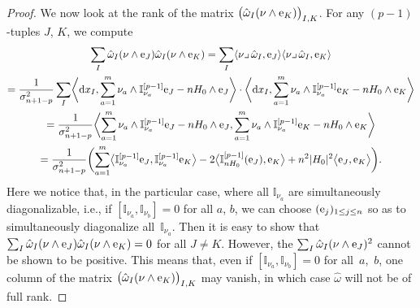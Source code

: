 \documentclass[pdftex]{sigma}
\numberwithin{equation}{section}
\begin{document}
\begin{proof}
We now look at the rank of the matrix $\bigl(\hat{\omega}_I(\nu\wedge {\rm e}_K)\bigr)_{I,K}$. For any $(p-1)$-tuples $J$, $K$, we compute
\begin{gather*}
\sum_I\hat{\omega}_I(\nu\wedge {\rm e}_J)\hat{\omega}_I(\nu\wedge {\rm e}_K)=\sum_I\langle\nu\lrcorner\,\hat{\omega}_I,{\rm e}_J\rangle\langle\nu\lrcorner\,\hat{\omega}_I,{\rm e}_K\rangle\\
 =\frac{1}{\sigma_{n+1-p}^2}\sum_I \biggl\langle {\rm d}x_I,\sum_{a=1}^m \nu_a\wedge\mathbb{I}_{\nu_a}^{[p-1]}{\rm e}_J-nH_0\wedge {\rm e}_J\biggr\rangle\cdot \biggl\langle {\rm d}x_I,\sum_{a=1}^m \nu_a\wedge\mathbb{I}_{\nu_a}^{[p-1]}{\rm e}_K-nH_0\wedge {\rm e}_K\biggr\rangle\\
 =\frac{1}{\sigma_{n+1-p}^2}\biggl\langle\sum_{a=1}^m \nu_a\wedge\mathbb{I}_{\nu_a}^{[p-1]}{\rm e}_J-nH_0\wedge {\rm e}_J,
\sum_{a=1}^m \nu_a\wedge\mathbb{I}_{\nu_a}^{[p-1]}{\rm e}_K-nH_0\wedge {\rm e}_K\biggr\rangle\\
 =\frac{1}{\sigma_{n+1-p}^2}\biggl(\sum_{a=1}^m\bigl\langle \mathbb{I}_{\nu_a}^{[p-1]}{\rm e}_J,\mathbb{I}_{\nu_a}^{[p-1]}{\rm e}_K\bigr\rangle
-2\bigl\langle\mathbb{I}_{nH_0}^{[p-1]}({\rm e}_J),{\rm e}_K\bigr\rangle+n^2|H_0|^2\bigl\langle {\rm e}_J,{\rm e}_K\bigr\rangle\biggr).
\end{gather*}
Here we notice that, in the particular case, where all $\mathbb{I}_{\nu_a}$ are simultaneously diagonalizable, i.e., if $[\mathbb{I}_{\nu_a},\mathbb{I}_{\nu_b}]=0$ for all $a$, $b$, we can choose $({\rm e}_j)_{1\leq j\leq n}$ so as to simultaneously diagonalize all~$\mathbb{I}_{\nu_a}$.
Then it is easy to show that $\sum_I\hat{\omega}_I(\nu\wedge {\rm e}_J)\hat{\omega}_I(\nu\wedge {\rm e}_K)=0$ for all $J\neq K$.
However, the $\sum_I\hat{\omega}_I(\nu\wedge {\rm e}_J)^2$ cannot be shown to be positive.
This means that, even if $[\mathbb{I}_{\nu_a},\mathbb{I}_{\nu_b}]=0$ for all~$a$,~$b$, one column of the matrix $\bigl(\hat{\omega}_I(\nu\wedge {\rm e}_K)\bigr)_{I,K}$ may vanish, in which case $\hat{\omega}$ will not be of full rank.


\end{proof}
\end{document}

